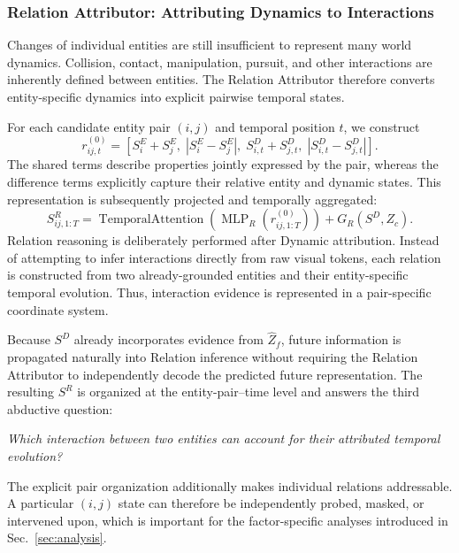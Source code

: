 \documentclass{article}
\begin{document}
\subsubsection{Relation Attributor: Attributing Dynamics to Interactions}
Changes of individual entities are still insufficient to represent many world dynamics. Collision, contact, manipulation, pursuit, and other interactions are inherently defined between entities. The Relation Attributor therefore converts entity-specific dynamics into explicit pairwise temporal states.

For each candidate entity pair $(i,j)$ and temporal position $t$, we construct
\begin{equation}
    r_{ij,t}^{(0)}
    =
    \left[
    S_i^E + S_j^E,\;
    |S_i^E-S_j^E|,\;
    S_{i,t}^D + S_{j,t}^D,\;
    |S_{i,t}^D - S_{j,t}^D|
    \right].
    \label{eq:relation-input-main}
\end{equation}
The shared terms describe properties jointly expressed by the pair, whereas the difference terms explicitly capture their relative entity and dynamic states. This representation is subsequently projected and temporally aggregated:
\begin{equation}
    S^R_{ij,1:T}
    =
    \operatorname{TemporalAttention}
    \left(
    \operatorname{MLP}_R(r_{ij,1:T}^{(0)})
    \right)
    + G_R(S^D,Z_c).
    \label{eq:relation-main}
\end{equation}
Relation reasoning is deliberately performed after Dynamic attribution. Instead of attempting to infer interactions directly from raw visual tokens, each relation is constructed from two already-grounded entities and their entity-specific temporal evolution. Thus, interaction evidence is represented in a pair-specific coordinate system.

Because $S^D$ already incorporates evidence from $\widehat{Z}_f$, future information is propagated naturally into Relation inference without requiring the Relation Attributor to independently decode the predicted future representation. The resulting $S^R$ is organized at the entity-pair--time level and answers the third abductive question:
\begin{center}
    \emph{Which interaction between two entities can account for their attributed temporal evolution?}
\end{center}
The explicit pair organization additionally makes individual relations addressable. A particular $(i,j)$ state can therefore be independently probed, masked, or intervened upon, which is important for the factor-specific analyses introduced in Sec.~\ref{sec:analysis}.
\end{document}
